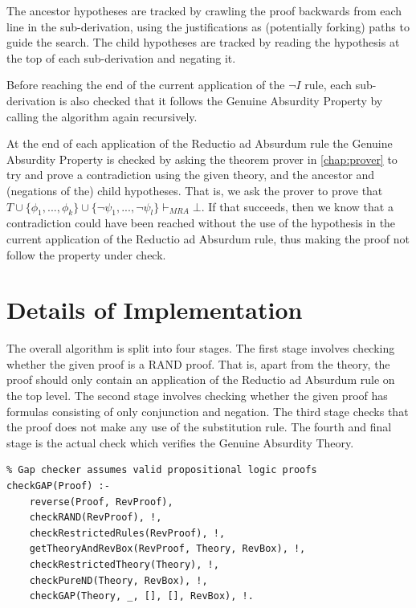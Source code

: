 \documentclass[11pt,twoside,a4paper]{report}
\begin{document}
The ancestor hypotheses are tracked by crawling the proof backwards from each line in the sub-derivation, using the justifications as (potentially forking) paths to guide the search. The child hypotheses are tracked by reading the hypothesis at the top of each sub-derivation and negating it.

Before reaching the end of the current application of the $\neg I$ rule, each sub-derivation is also checked that it follows the Genuine Absurdity Property by calling the algorithm again recursively.

At the end of each application of the Reductio ad Absurdum rule the Genuine Absurdity Property is checked by asking the theorem prover in \autoref{chap:prover} to try and prove a contradiction using the given theory, and the ancestor and (negations of the) child hypotheses. That is, we ask the prover to prove that $T\cup\{\phi_1, ..., \phi_k\}\cup\{\neg\psi_1, ..., \neg\psi_l\}\vdash_{MRA}\bot$. If that succeeds, then we know that a contradiction could have been reached without the use of the hypothesis in the current application of the Reductio ad Absurdum rule, thus making the proof not follow the property under check.

\section{Details of Implementation}
The overall algorithm is split into four stages. The first stage involves checking whether the given proof is a RAND proof. That is, apart from the theory, the proof should only contain an application of the Reductio ad Absurdum rule on the top level. The second stage involves checking whether the given proof has formulas consisting of only conjunction and negation. The third stage checks that the proof does not make any use of the substitution rule. The fourth and final stage is the actual check which verifies the Genuine Absurdity Theory.

\begin{lstlisting}[caption={Genuine Absurdity Property top level predicate},label=lst:gaptoppred]
% Checks that the given proof follows the GAP property
% Gap checker assumes valid propositional logic proofs
checkGAP(Proof) :- 
	reverse(Proof, RevProof), 
	checkRAND(RevProof), !,
	checkRestrictedRules(RevProof), !,
	getTheoryAndRevBox(RevProof, Theory, RevBox), !,
	checkRestrictedTheory(Theory), !,
	checkPureND(Theory, RevBox), !,
	checkGAP(Theory, _, [], [], RevBox), !.
\end{lstlisting}
\end{document}
